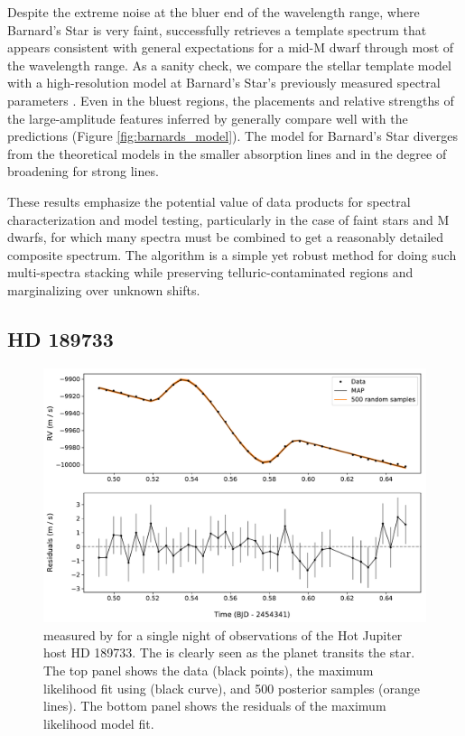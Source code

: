 \documentclass[modern]{aastex62}
\newcommand{\Mdwarf}{Barnard's Star\xspace} %
\begin{document}
Despite the extreme noise at the bluer end of the wavelength range, where \Mdwarf is very faint, \wobble successfully retrieves a template spectrum that appears consistent with general expectations for a mid-M dwarf through most of the \HARPS wavelength range. 
As a sanity check, we compare the \wobble stellar template model with a high-resolution \PHOENIX model at \Mdwarf's previously measured spectral parameters \citep[\teff = 3200 K, \logg = 5.0, and \mh = $-0.5$;][and references therein]{Husser2013, Artigau2018}. 
Even in the bluest regions, the placements and relative strengths of the large-amplitude features inferred by \wobble generally compare well with the \PHOENIX predictions (Figure \ref{fig:barnards_model}). 
The \wobble model for \Mdwarf diverges from the theoretical models in the smaller absorption lines and in the degree of broadening for strong lines.  

These results emphasize the potential value of \wobble data products for spectral characterization and model testing, particularly in the case of faint stars and M dwarfs, for which many spectra must be combined to get a reasonably detailed composite spectrum. 
The \wobble algorithm is a simple yet robust method for doing such multi-spectra stacking while preserving telluric-contaminated regions and marginalizing over unknown \RV shifts.

\subsection{HD 189733}

\begin{figure}
\centering
\includegraphics[width=5in]{hd189_rm}
\caption{\RVs measured by \wobble for a single night of observations of the Hot 
         Jupiter host HD 189733. The \RM is clearly seen as the planet transits 
         the star. The top panel shows the data (black points), the maximum
         likelihood fit using \starry (black curve), and 500 posterior samples
         (orange lines). The bottom panel shows the residuals of the maximum
         likelihood model fit.}
\label{fig:hd189_rm}
\end{figure}
\end{document}
